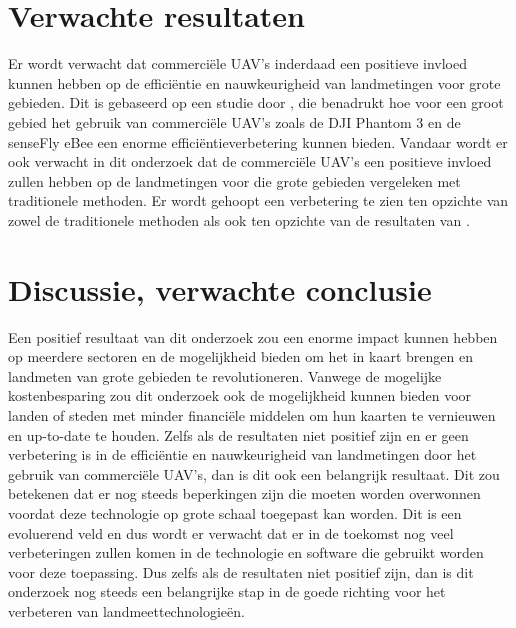 \documentclass{hogent-article}
\begin{document}
\section{Verwachte resultaten}%
\label{sec:verwachte-resultaten}

Er wordt verwacht dat commerciële UAV's inderdaad een positieve invloed kunnen hebben op de efficiëntie en nauwkeurigheid van landmetingen voor grote gebieden. Dit is gebaseerd op een studie door \textcite{madawalagama2016low}, die benadrukt hoe voor een groot gebied het gebruik van commerciële UAV's zoals de DJI Phantom 3\textsuperscript{\textregistered} en de senseFly eBee\textsuperscript{\textregistered} een enorme efficiëntieverbetering kunnen bieden. 
Vandaar wordt er ook verwacht in dit onderzoek dat de commerciële UAV's een positieve invloed zullen hebben op de landmetingen voor die grote gebieden vergeleken met traditionele methoden. Er wordt gehoopt een verbetering te zien ten opzichte van zowel de traditionele methoden als ook ten opzichte van de resultaten van \textcite{madawalagama2016low}.

\section{Discussie, verwachte conclusie}%
\label{sec:discussie-conclusie}


Een positief resultaat van dit onderzoek zou een enorme impact kunnen hebben op meerdere sectoren en de mogelijkheid bieden om het in kaart brengen en landmeten van grote gebieden te revolutioneren. Vanwege de mogelijke kostenbesparing zou dit onderzoek ook de mogelijkheid kunnen bieden voor landen of steden met minder financiële middelen om hun kaarten te vernieuwen en up-to-date te houden.
Zelfs als de resultaten niet positief zijn en er geen verbetering is in de efficiëntie en nauwkeurigheid van landmetingen door het gebruik van commerciële UAV's, dan is dit ook een belangrijk resultaat. Dit zou betekenen dat er nog steeds beperkingen zijn die moeten worden overwonnen voordat deze technologie op grote schaal toegepast kan worden.
Dit is een evoluerend veld en dus wordt er verwacht dat er in de toekomst nog veel verbeteringen zullen komen in de technologie en software die gebruikt worden voor deze toepassing. Dus zelfs als de resultaten niet positief zijn, dan is dit onderzoek nog steeds een belangrijke stap in de goede richting voor het verbeteren van landmeettechnologieën.


\printbibliography[heading=bibintoc]
\end{document}

